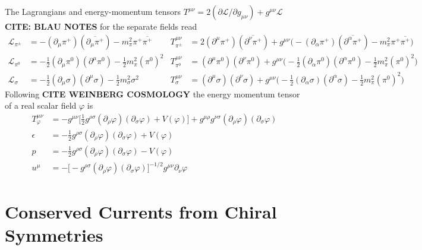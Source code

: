 The Lagrangians and energy-momentum tensors $T^{\mu\nu}=2(\partial\mathscr{L}/\partial g_{\mu\nu})+g^{\mu\nu}\mathscr{L}$ \textbf{CITE: BLAU NOTES} for the separate fields read
\begin{subequations}
    \begin{align}
        \mathscr{L}_{\pi^\pm}&=-(\partial_\mu\pi^+)(\overline{\partial_\mu\pi^+})-m_\pi^2\pi^+\overline{\pi^+}&T^{\mu\nu}_{\pi^\pm}&=2(\partial^\mu\pi^+)(\overline{\partial^\nu\pi^+})+g^{\mu\nu}\big(-(\partial_\alpha\pi^+)(\overline{\partial^\alpha\pi^+})-m_\pi^2\pi^+\overline{\pi^+}\big)\\
        \mathscr{L}_{\pi^0}&=-\frac{1}{2}(\partial_\mu\pi^0)(\partial^\mu\pi^0)-\frac{1}{2}m_\pi^2(\pi^0)^2&T^{\mu\nu}_{\pi^0}&=(\partial^\mu\pi^0)(\partial^\nu\pi^0)+g^{\mu\nu}\big(-\frac{1}{2}(\partial_\alpha\pi^0)(\partial^\alpha\pi^0)-\frac{1}{2}m_\pi^2(\pi^0)^2\big)\\
        \mathscr{L}_\sigma&=-\frac{1}{2}(\partial_\mu\sigma)(\partial^\mu\sigma)-\frac{1}{2}m_\sigma^2\sigma^2&T^{\mu\nu}_{\sigma}&=(\partial^\mu\sigma)(\partial^\nu\sigma)+g^{\mu\nu}\big(-\frac{1}{2}(\partial_\alpha\sigma)(\partial^\alpha\sigma)-\frac{1}{2}m_\pi^2(\pi^0)^2\big)
    \end{align}
\end{subequations}
Following \textbf{CITE WEINBERG COSMOLOGY} the energy momentum tensor of a real scalar field $\varphi$ is
\begin{subequations}
    \begin{align}
        T_\varphi^{\mu\nu}&=-g^{\mu\nu}\big[\frac{1}{2}g^{\rho\sigma}(\partial_\rho\varphi)(\partial_\sigma\varphi)+V(\varphi)\big]+g^{\mu\rho}g^{\nu\sigma}(\partial_\rho\varphi)(\partial_\sigma\varphi)\\
        \epsilon&=-\frac{1}{2}g^{\rho\sigma}(\partial_\rho\varphi)(\partial_\sigma\varphi)+V(\varphi)\\
        p&=-\frac{1}{2}g^{\rho\sigma}(\partial_\rho\varphi)(\partial_\sigma\varphi)-V(\varphi)\\
        u^\mu&=-\big[-g^{\rho\sigma}(\partial_\rho\varphi)(\partial_\sigma\varphi)\big]^{-1/2}g^{\mu\nu}\partial_\nu\varphi
    \end{align}
\end{subequations}

\section{Conserved Currents from Chiral Symmetries}

